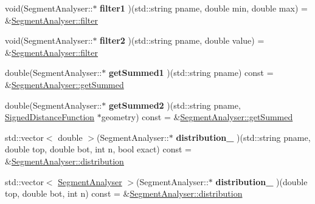 \begin{DoxyCompactItemize}
\item 
\mbox{\label{namespaceCPlantBox_acc94019cf18d7af29b946d91bc0bc739}} 
void(Segment\+Analyser\+::$\ast$ {\bfseries filter1} )(std\+::string pname, double min, double max) = \&\hyperlink{classCPlantBox_1_1SegmentAnalyser_a23c673b6bca999d2ed47059e3e708f86}{Segment\+Analyser\+::filter}
\item 
\mbox{\label{namespaceCPlantBox_aaefff45c536a4f02f4c0c93453a7dcdf}} 
void(Segment\+Analyser\+::$\ast$ {\bfseries filter2} )(std\+::string pname, double value) = \&\hyperlink{classCPlantBox_1_1SegmentAnalyser_a23c673b6bca999d2ed47059e3e708f86}{Segment\+Analyser\+::filter}
\item 
\mbox{\label{namespaceCPlantBox_a889b86794547e2b1a9055d0c4e6cdb18}} 
double(Segment\+Analyser\+::$\ast$ {\bfseries get\+Summed1} )(std\+::string pname) const = \&\hyperlink{classCPlantBox_1_1SegmentAnalyser_a77c317cdd72d22e4e2181761b59dab76}{Segment\+Analyser\+::get\+Summed}
\item 
\mbox{\label{namespaceCPlantBox_a35f54a2138871ce2a2576c0cf52a95d1}} 
double(Segment\+Analyser\+::$\ast$ {\bfseries get\+Summed2} )(std\+::string pname, \hyperlink{classCPlantBox_1_1SignedDistanceFunction}{Signed\+Distance\+Function} $\ast$geometry) const = \&\hyperlink{classCPlantBox_1_1SegmentAnalyser_a77c317cdd72d22e4e2181761b59dab76}{Segment\+Analyser\+::get\+Summed}
\item 
\mbox{\label{namespaceCPlantBox_a113426e81942b16acb9d916b2ee383e7}} 
std\+::vector$<$ double $>$(Segment\+Analyser\+::$\ast$ {\bfseries distribution\+\_} )(std\+::string pname, double top, double bot, int n, bool exact) const = \&\hyperlink{classCPlantBox_1_1SegmentAnalyser_a847f313257ffd7a8442d2aecd12e34d2}{Segment\+Analyser\+::distribution}
\item 
\mbox{\label{namespaceCPlantBox_ac45fec43a39a6bd17f667a97fa4e8da5}} 
std\+::vector$<$ \hyperlink{classCPlantBox_1_1SegmentAnalyser}{Segment\+Analyser} $>$(Segment\+Analyser\+::$\ast$ {\bfseries distribution\+\_} )(double top, double bot, int n) const = \&\hyperlink{classCPlantBox_1_1SegmentAnalyser_a847f313257ffd7a8442d2aecd12e34d2}{Segment\+Analyser\+::distribution}

\end{DoxyCompactItemize}
